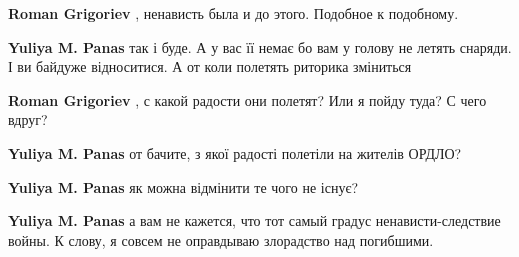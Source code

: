 \begin{itemize}
\begin{itemize}
\begin{itemize}
\textbf{Roman Grigoriev} , ненависть была и до этого. Подобное к подобному.

 
\textbf{Yuliya M. Panas} так і буде. А у вас її немає бо вам у голову не летять
снаряди. І ви байдуже відноситися. А от коли полетять риторика зміниться 🤷

 
\textbf{Roman Grigoriev} , с какой радости они полетят? Или я пойду туда? С чего вдруг?

 
\textbf{Yuliya M. Panas} от бачите, з якої радості полетіли на жителів ОРДЛО?

 
\textbf{Yuliya M. Panas} як можна відмінити те чого не існує?

 
\textbf{Yuliya M. Panas} а вам не кажется, что тот самый градус
ненависти-следствие войны. К слову, я совсем не оправдываю злорадство над
погибшими.

 

\end{itemize}
\end{itemize}
\end{itemize}
